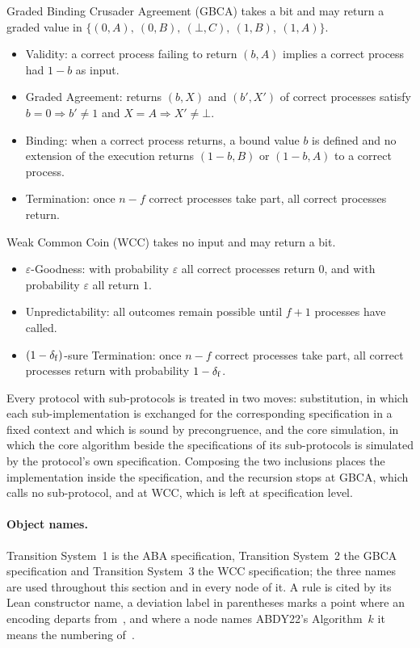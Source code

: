 Graded Binding Crusader Agreement (GBCA) takes a bit and may return a graded value in $\{(0,A),\ (0,B),\ (\bot,C),\ (1,B),\ (1,A)\}$.
\begin{itemize}
  \item Validity: a correct process failing to return $(b,A)$ implies a correct process had $1-b$ as input.
  \item Graded Agreement: returns $(b,X)$ and $(b',X')$ of correct processes satisfy $b = 0 \Rightarrow b' \neq 1$ and $X = A \Rightarrow X' \neq \bot$.
  \item Binding: when a correct process returns, a bound value $b$ is defined and no extension of the execution returns $(1-b,B)$ or $(1-b,A)$ to a correct process.
  \item Termination: once $n-f$ correct processes take part, all correct processes return.
\end{itemize}

Weak Common Coin (WCC) takes no input and may return a bit.
\begin{itemize}
  \item $\varepsilon$-Goodness: with probability $\varepsilon$ all correct processes return $0$, and with probability $\varepsilon$ all return $1$.
  \item Unpredictability: all outcomes remain possible until $f+1$ processes have called.
  \item $(1-\delta_{\mathrm{f}})$-sure Termination: once $n-f$ correct processes take part, all correct processes return with probability $1-\delta_{\mathrm{f}}$.
\end{itemize}

Every protocol with sub-protocols is treated in two moves: substitution, in which each sub-implementation is exchanged for the corresponding specification in a fixed context and which is sound by precongruence, and the core simulation, in which the core algorithm beside the specifications of its sub-protocols is simulated by the protocol's own specification.
Composing the two inclusions places the implementation inside the specification, and the recursion stops at GBCA, which calls no sub-protocol, and at WCC, which is left at specification level.

\paragraph{Object names.}
Transition System~1 is the ABA specification, Transition System~2 the GBCA specification and Transition System~3 the WCC specification; the three names are used throughout this section and in every node of it.
A rule is cited by its Lean constructor name, a deviation label in parentheses marks a point where an encoding departs from~\cite{LeslieBP}, and where a node names ABDY22's Algorithm~$k$ it means the numbering of~\cite{ABDY22}.

